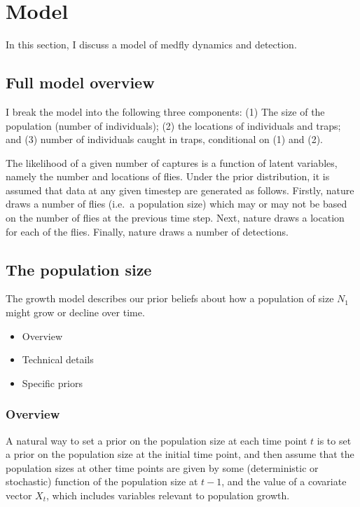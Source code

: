 \documentclass[
]{book}
\providecommand{\tightlist}{%
  \setlength{\itemsep}{0pt}\setlength{\parskip}{0pt}}
\begin{document}
\hypertarget{model}{%
\section{Model}\label{model}}

In this section, I discuss a model of medfly dynamics and detection.

\hypertarget{full-model-overview}{%
\subsection{Full model overview}\label{full-model-overview}}

I break the model into the following three components: (1) The size of the population (number of individuals); (2) the locations of individuals and traps; and (3) number of individuals caught in traps, conditional on (1) and (2).

The likelihood of a given number of captures is a function of latent variables, namely the number and locations of flies. Under the prior distribution, it is assumed that data at any given timestep are generated as follows. Firstly, nature draws a number of flies (i.e.~a population size) which may or may not be based on the number of flies at the previous time step. Next, nature draws a location for each of the flies. Finally, nature draws a number of detections.

\hypertarget{the-population-size}{%
\subsection{The population size}\label{the-population-size}}

The growth model describes our prior beliefs about how a population of size \(N_1\) might grow or decline over time.

\begin{itemize}
\tightlist
\item
  Overview
\item
  Technical details
\item
  Specific priors
\end{itemize}

\hypertarget{overview}{%
\subsubsection{Overview}\label{overview}}

A natural way to set a prior on the population size at each time point \(t\) is to set a prior on the population size at the initial time point, and then assume that the population sizes at other time points are given by some (deterministic or stochastic) function of the population size at \(t-1\), and the value of a covariate vector \(X_t\), which includes variables relevant to population growth.
\end{document}
